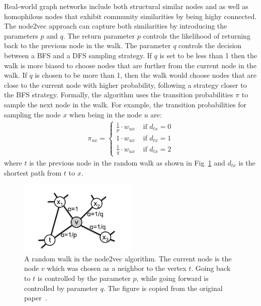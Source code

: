 Real-world graph networks include both structural similar nodes and as well as 
homophilous nodes that exhibit community similarities by being highy connected. 
The node2vec approach can capture both similarities by introducing the parameters 
$p$ and $q$. The return parameter $p$ controls the likelihood of returning back 
to the previous node in the walk. The parameter $q$ controls the decision 
between a BFS and a DFS sampling strategy. If $q$ is set to be less than 1 
then the walk is more biased to choose nodes that are further from the current 
node in the walk. If $q$ is chosen to be more than 1, then the walk would choose 
nodes that are close to the current node with higher probability, following a 
strategy closer to the BFS strategy. Formally, the algorithm uses the transition 
probabilities $\pi$ to sample the next node in the walk. For example, the 
transition probabilities for sampling the node $x$ when being in the node $u$ are:
\begin{align}
\pi_{ux} = \begin{cases} \frac{1}{p}\cdot w_{ux} & \text{ if } d_{tx} = 0 \\
1\cdot w_{ux} & \text{ if } d_{tx} = 1 \\
\frac{1}{q}\cdot w_{ux} & \text{ if } d_{tx} = 2
\end{cases}
\end{align}
where $t$ is the previous node in the random walk as shown in
Fig~\ref{node2vec_png} and $d_{tx}$ is the shortest path from $t$ to $x$.
\begin{figure}
\begin{center}
\includegraphics[width=0.5\textwidth]{figures/node2vec.png}
\end{center}
\caption{A random walk in the node2vec algorithm. The current node is the node
$v$ which was chosen as a neighbor to the vertex $t$.
Going back to $t$ is controlled by the parameter $p$, while going forward is
controlled by parameter $q$. The figure is copied from the original
paper~\cite{grover2016node2vec}.}
\label{node2vec_png}
\end{figure}

